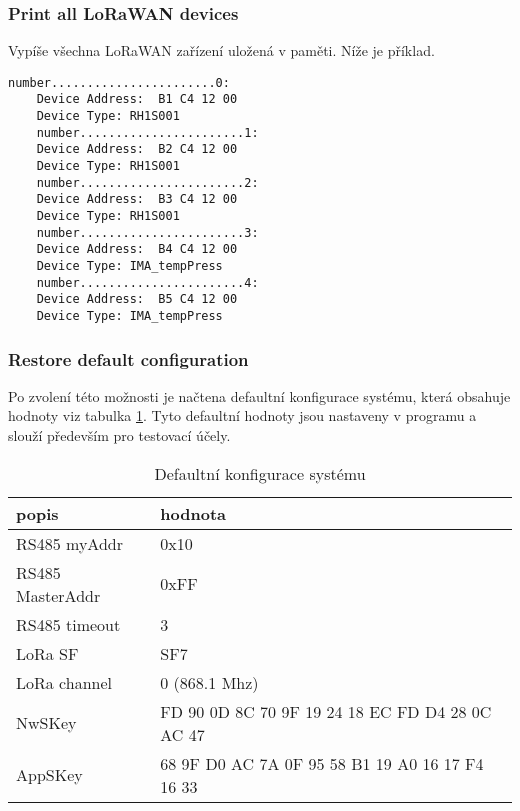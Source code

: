 \subsubsection{Print all LoRaWAN devices}
Vypíše všechna LoRaWAN zařízení uložená v paměti. Níže je příklad.


\begin{lstlisting}[style=log]    
    number.......................0:
    Device Address:  B1 C4 12 00
    Device Type: RH1S001
    number.......................1:
    Device Address:  B2 C4 12 00
    Device Type: RH1S001
    number.......................2:
    Device Address:  B3 C4 12 00
    Device Type: RH1S001
    number.......................3:
    Device Address:  B4 C4 12 00
    Device Type: IMA_tempPress
    number.......................4:
    Device Address:  B5 C4 12 00
    Device Type: IMA_tempPress
\end{lstlisting}



\subsubsection{Restore default configuration}
Po zvolení této možnosti je načtena defaultní konfigurace systému, která obsahuje hodnoty viz tabulka \ref{table:5}. Tyto defaultní hodnoty jsou nastaveny v programu a slouží především pro testovací účely.

\begin{table}[!h]
    \centering
    \begin{ctucolortab}
    \begin{tabular}{ |l|l| }
     \hline

     popis              & hodnota         \\ \hline \hline
     RS485 myAddr       & 0x10            \\ \hline
     RS485 MasterAddr   & 0xFF            \\ \hline
     RS485 timeout      & 3               \\ \hline
     LoRa SF            & SF7             \\ \hline
     LoRa channel       & 0 (868.1 Mhz)   \\ \hline
     NwSKey             & FD 90 0D 8C 70 9F 19 24 18 EC FD D4 28 0C AC 47  \\ \hline
     AppSKey            & 68 9F D0 AC 7A 0F 95 58 B1 19 A0 16 17 F4 16 33  \\ \hline

    \end{tabular}
\end{ctucolortab}
    \caption{Defaultní konfigurace systému}
    \label{table:5}
\end{table}



